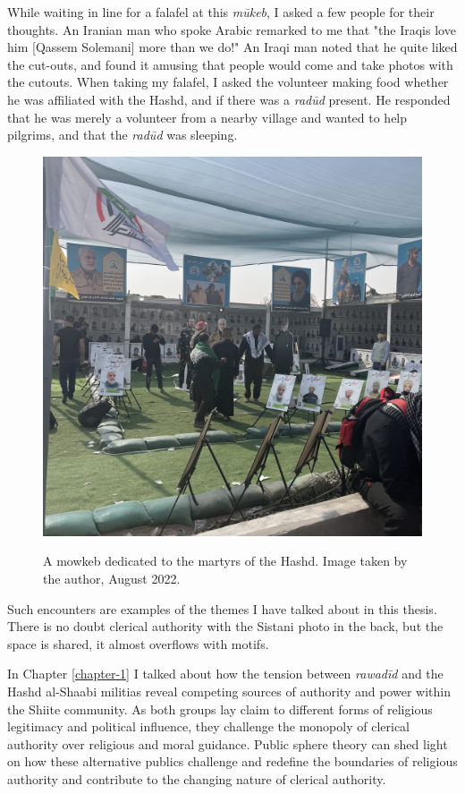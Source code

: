 While waiting in line for a falafel at this \emph{mūkeb}, I asked a few people for their thoughts. An Iranian man who spoke Arabic remarked to me that "the Iraqis love him [Qassem Solemani] more than we do!" An Iraqi man noted that he quite liked the cut-outs, and found it amusing that people would come and take photos with the cutouts. When taking my falafel, I asked the volunteer making food whether he was affiliated with the Hashd, and if there was a \emph{radūd} present. He responded that he was merely a volunteer from a nearby village and wanted to help pilgrims, and that the \emph{radūd} was sleeping. 

\begin{figure}[h]
\caption{A mowkeb dedicated to the martyrs of the Hashd. Image taken by the author, August 2022.}
\centering
\includegraphics[width=.75\textwidth]{images/qassem-mowkeb.jpeg}
\label{fig:qassem-mowkeb}
\end{figure}

Such encounters are examples of the themes I have talked about in this thesis. There is no doubt clerical authority with the Sistani photo in the back, but the space is shared, it almost overflows with motifs. 

In Chapter \ref{chapter-1} I talked about how the tension between \emph{rawadīd} and the Hashd al-Shaabi militias reveal competing sources of authority and power within the Shiite community. As both groups lay claim to different forms of religious legitimacy and political influence, they challenge the monopoly of clerical authority over religious and moral guidance. Public sphere theory can shed light on how these alternative publics challenge and redefine the boundaries of religious authority and contribute to the changing nature of clerical authority. 

